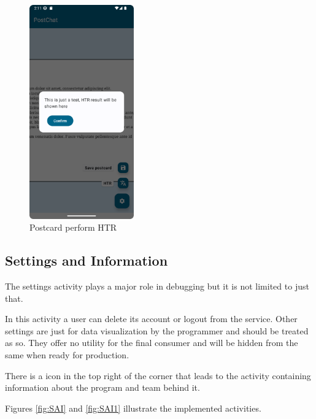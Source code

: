 \begin{figure}[!ht]
	\centering
	\includegraphics[trim={0cm -3cm 0 -3cm}, width=0.4\textwidth]{./Chapter6/Figures/PostcardActivityHTR}
	\caption{Postcard perform HTR}
	\label{fig:VA2}
\end{figure}


\subsection{Settings and Information}
The settings activity plays a major role in debugging but it is not limited to just that.

In this activity a user can delete its account or logout from the service.
Other settings are just for data visualization by the programmer and should be treated as so. They offer no utility for the final consumer and will be hidden from the same when ready for production.

There is a icon in the top right of the corner that leads to the activity containing information about the program and team behind it.

Figures \ref{fig:SAI} and \ref{fig:SAI1} illustrate the implemented activities.

